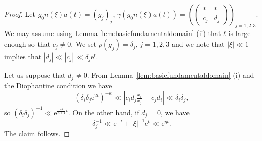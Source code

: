 \documentclass[12pt]{amsart}
\theoremstyle{definition}
\theoremstyle{remark}
\numberwithin{equation}{section}
\newcommand{\e}{\mathrm{e}}
\begin{document}
\begin{proof}
  Let $g_0 n(\xi) a(t) = (g_j)_j$, $\gamma(g_0 n(\xi) a(t)) = \left(  \begin{pmatrix}  * & * \\
    c_j & d_j
  \end{pmatrix}
\right)_{\!\!j=1,2,3}$.
We may assume using Lemma \ref{lem:basicfundamentaldomain} (ii) that  $t$ is large enough so that $c_j\neq 0$.
We set $\rho(g_j) = \delta_j$, $j = 1,2,3$ and we note that $|\xi| \ll 1$ implies that $|d_j| \ll |c_j| \ll \delta_j \e^t$.

Let us suppose that $d_j \neq 0$. 
  From Lemma~\ref{lem:basicfundamentaldomain} (i) and the Diophantine condition we have
  \begin{equation}
    \label{eq:deltalowerbound1}
    (\delta_i \delta_j \e^{2t})^{-\kappa} \ll |c_i d_j \tfrac{x_i}{x_j} - c_j d_i| \ll \delta_i \delta_j,
  \end{equation}
  so $(\delta_i \delta_j)^{-1} \ll \e^{\frac{2\kappa}{\kappa + 1}t}$.
  On the other hand, if $d_j = 0$, we have
  \begin{equation}
    \label{eq:dj0lowerbound}
    \delta_j^{-1} \ll \e^{-t} + |\xi|^{-1}  \e^t \ll \e^{\eta t}.
  \end{equation}
  The claim follows.
\end{proof}
\end{document}
